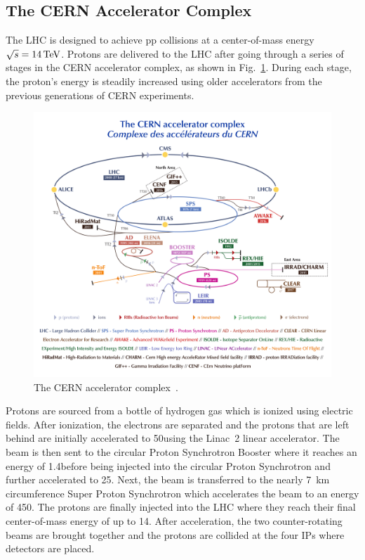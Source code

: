 \subsection{The CERN Accelerator Complex}

The LHC is designed to achieve pp collisions at a center-of-mass energy $\sqrt{s} = 14\,\text{Te\hspace{-.08em}V}$. Protons are delivered to the LHC after going through a series of stages in the CERN accelerator complex, as shown in Fig.~\ref{accelerator-complex}. During each stage, the proton's energy is steadily increased using older accelerators from the previous generations of CERN experiments.  

\begin{figure}[!htb]
	\centering
	\includegraphics[width=1.0\textwidth]{figures/CCC-v2018-print-v2.pdf}
	\caption{The CERN accelerator complex~\cite{Mobs:2636343}.}
	\label{accelerator-complex}
\end{figure}

Protons are sourced from a bottle of hydrogen gas which is ionized using electric fields. After ionization, the electrons are separated and the protons that are left behind are initially accelerated to 50\MeV using the Linac~2 linear accelerator. The beam is then sent to the circular Proton Synchrotron Booster where it reaches an energy of 1.4\GeV before being injected into the circular Proton Synchrotron and further accelerated to 25\GeV. Next, the beam is transferred to the nearly 7~km circumference Super Proton Synchrotron which accelerates the beam to an energy of 450\GeV. The protons are finally injected into the LHC where they reach their final center-of-mass energy of up to 14\TeV. After acceleration, the two counter-rotating beams are brought together and the protons are collided at the four IPs where detectors are placed.

